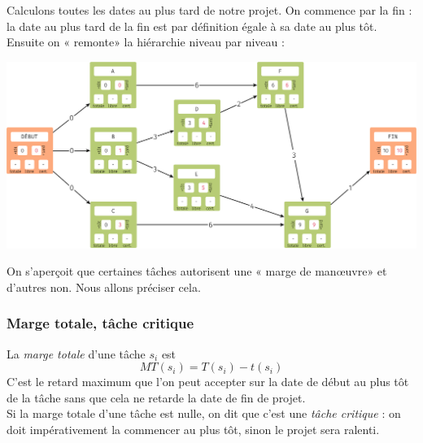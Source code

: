 Calculons toutes les dates au plus tard de notre projet. On commence par la fin : la date au plus tard de la fin est par définition égale à sa date au plus tôt. Ensuite on « remonte»{} la hiérarchie niveau par niveau :
\begin{center}
    \includegraphics[width=\linewidth]{graphes2/img/exemple_mpm3.png}
\end{center}
On s'aperçoit que certaines tâches autorisent une « marge de man\oe uvre»{} et d'autres non. Nous allons préciser cela.
\subsubsection*{Marge totale, tâche critique}
\begin{definition}
    La \textit{marge totale} d'une tâche $s_i$ est $$MT(s_i)=T(s_i)-t(s_i)$$
    C'est le retard maximum que l'on peut accepter sur la date de début au plus tôt de la tâche sans que cela ne retarde la date de fin de projet.\\

    Si la marge totale d'une tâche est nulle, on dit que c'est une \textit{tâche critique} : on doit impérativement la commencer au plus tôt, sinon le projet sera ralenti.
\end{definition}

\begin{exemple}[]
\end{exemple}

